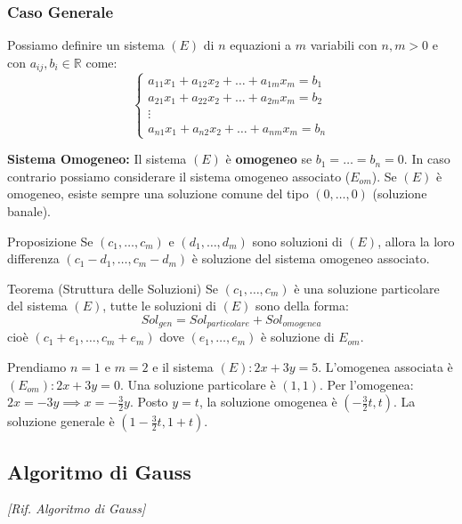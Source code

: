 \subsubsection{Caso Generale}
Possiamo definire un sistema $(E)$ di $n$ equazioni a $m$ variabili con $n,m > 0$ e con $a_{ij}, b_{i} \in \mathbb{R}$ come:
$$
\begin{cases}
a_{11}x_1 + a_{12}x_2 + \ldots + a_{1m}x_m = b_1 \\
a_{21}x_1 + a_{22}x_2 + \ldots + a_{2m}x_m = b_2 \\
\vdots \\
a_{n1}x_1 + a_{n2}x_2 + \ldots + a_{nm}x_m = b_n
\end{cases}
$$

\begin{definitionbox}
\textbf{Sistema Omogeneo:} Il sistema $(E)$ è \textbf{omogeneo} se $b_1 = \ldots = b_n = 0$. In caso contrario possiamo considerare il sistema omogeneo associato ($E_{om}$).
Se $(E)$ è omogeneo, esiste sempre una soluzione comune del tipo $(0, \ldots, 0)$ (soluzione banale).
\end{definitionbox}

\begin{concept}{Proposizione}
Se $(c_1, \dots, c_m)$ e $(d_1, \dots, d_m)$ sono soluzioni di $(E)$, allora la loro differenza $(c_1 - d_1, \dots, c_m - d_m)$ è soluzione del sistema omogeneo associato.
\end{concept}

\begin{concept}{Teorema (Struttura delle Soluzioni)}
Se $(c_1,\ldots,c_m)$ è una soluzione particolare del sistema $(E)$, tutte le soluzioni di $(E)$ sono della forma:
$$ Sol_{gen} = Sol_{particolare} + Sol_{omogenea} $$
cioè $(c_1 + e_1, \ldots, c_m + e_m)$ dove $(e_1,\ldots,e_m)$ è soluzione di $E_{om}$.
\end{concept}

\begin{exercisebox}[title={Esempio 1.2}]
Prendiamo $n=1$ e $m=2$ e il sistema $(E): 2x + 3y = 5$. L'omogenea associata è $(E_{om}): 2x + 3y = 0$.
Una soluzione particolare è $(1,1)$.
Per l'omogenea: $2x = -3y \implies x = -\frac{3}{2}y$. Posto $y=t$, la soluzione omogenea è $(-\frac{3}{2}t, t)$.
La soluzione generale è $(1 - \frac{3}{2}t, 1 + t)$.
\end{exercisebox}

\subsection{Algoritmo di Gauss}
\emph{[Rif. Algoritmo di Gauss]}

